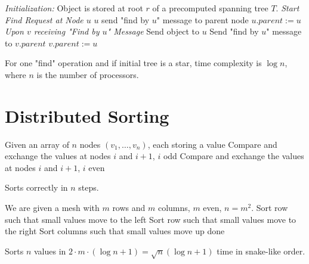 \documentclass[11pt, oneside]{book}   						%
\begin{document}
\begin{algorithm}
\caption{}\label{ivy}
\begin{algorithmic}[1]
\Statex\textit{Initialization: }{Object is stored at root $r$ of a precomputed spanning tree $T$.}
\Statex
\Statex\textit{Start Find Request at Node $u$}
\State $u$ send "find by $u$" message to parent node
\State $u.parent := u$
\Statex
\Statex\textit{Upon $v$ receiving "Find by $u$" Message}
	\State Send object to $u$
\Else
	\State Send "find by $u$" message to $v.parent$
\EndIf
$v.parent := u$ 
\end{algorithmic}
\end{algorithm}
\begin{mythm} For one "find" operation and if initial tree is a star, time complexity is $\log n$, where $n$ is the number of processors.\end{mythm}

\section{Distributed Sorting}
\textbf{}
\begin{algorithm}
\caption{}\label{oddeven}
\begin{algorithmic}[1]
\State Given an array of $n$ nodes $(v_1,\hdots, v_n)$, each storing a value
\Repeat
	\State Compare and exchange the values at nodes $i$ and $i+1$, $i$ odd
	\State Compare and exchange the values at nodes $i$ and $i+1$, $i$ even
\end{algorithmic}
\end{algorithm}
\begin{mythm} Sorts correctly in $n$ steps.\end{mythm}

\begin{algorithm}[H]
\caption{}\label{shearsort}
\begin{algorithmic}[1]
\State We are given a mesh with $m$ rows and $m$ columns, $m$ even, $n=m^2$.
		\ForEach[row]
				\State Sort row such that small values move to the left
			\Else
				\State Sort row such that small values move to the right
			\EndIf
		\EndForEach
	\Else
		\State Sort columns such that small values move up
	\EndIf
\Until done
\end{algorithmic}
\end{algorithm}
\begin{mythm} Sorts $n$ values in $2\cdot m\cdot (\log n +1)= \sqrt{n}(\log n+1)$ time in snake-like order.\end{mythm}
\end{document}
